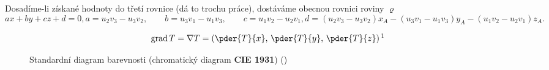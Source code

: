 \documentclass{scrbook}
\begin{document}
%
% 
Dosadíme-li získané hodnoty do třetí rovnice (dá to trochu práce), dostáváme obecnou  rovnici
roviny \(\varrho\)
\begin{subequations}\label{mai:eq041}
  \begin{equation}
    ax + by + cz + d= 0,  \label{mai:eq041a}
  \end{equation}
  \begin{equation}
    a = u_2v_3 - u_3v_2, \qquad 
    b = u_3v_1 - u_1v_3, \qquad 
    c = u_1v_2 - u_2v_1, \label{mai:eq041b}
  \end{equation}
  \begin{equation}
    d = (u_2v_3 - u_3v_2)x_A - 
        (u_3v_1 - u_1v_3)y_A - 
        (u_1v_2 - u_2v_1)z_A. \label{mai:eq041c}
  \end{equation}
\end{subequations}

\begin{equation}\label{fyz:eq252}
  \mathrm{grad}\,T =\nabla T = \left(\pder{T}{x},\, \pder{T}{y},\,\pder{T}{z} \right)
  \footnotemark
\end{equation}

\begin{figure}[ht!]  %
  \centering
  \caption{Standardní diagram barevnosti (chromatický diagram \textbf{CIE 
   1931}\protect\footnotemark) 
          (\cite[s.~468]{Feynman01})}
  \label{fyz:fig133}
\end{figure}
\end{document}
